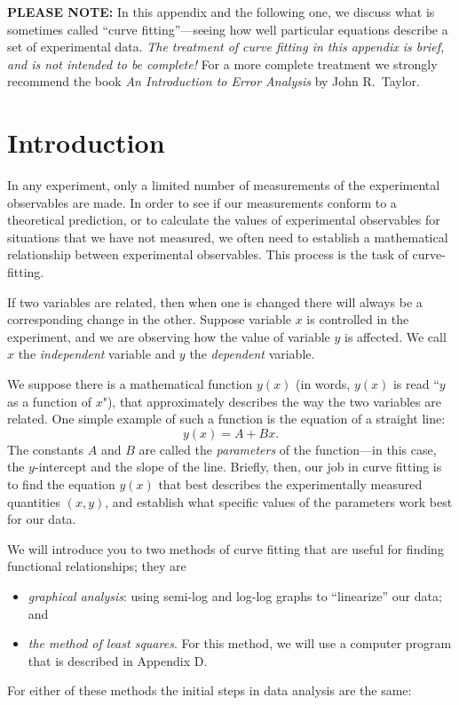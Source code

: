\newapp
\label{datahandle}
{\bf PLEASE NOTE:}  In this appendix and the following one,
 we discuss what is sometimes
called ``curve fitting''---seeing how well particular equations
describe a set of experimental data.  {\em The treatment of curve
fitting
in this appendix is brief, and is not intended to be complete!}
For a more complete treatment we strongly recommend the book {\em An
Introduction to Error Analysis} by John R.~Taylor.

\section*{Introduction}

     In any experiment, only a limited number of measurements of
the experimental observables are made.  In order to see if our
measurements conform to a theoretical prediction, or to calculate
the values of experimental observables for situations that we
have not measured, we often need to establish a mathematical
relationship between experimental observables.  This process is the
task of curve-fitting.

    If two variables are related, then when one is changed there will
always be a corresponding change in the other.  Suppose variable $x$
is controlled in the experiment, and we are observing how the value of
variable $y$ is affected.  We call $x$  the {\em independent} variable
and $y$  the {\em dependent} variable.

We suppose there is a mathematical function $y(x)$
(in words, $y(x)$ is read ``$y$ as a function of $x$"), that
approximately
describes the way the two variables are related.  One simple example of
such a function is the equation of a straight line:
\[
y(x) = A + Bx .
\]
The constants $A$ and $B$ are called the {\em parameters} of the
function---in this case, the $y$-intercept and the slope of the line.
Briefly, then, our job in curve fitting is to
find the equation $y(x)$ that best describes the
experimentally measured quantities $(x, y)$,   and
establish what specific values of the parameters work best for our
data.

     We will introduce you to two methods of curve fitting that
are useful for finding functional relationships; they are
\begin{itemize}
	\item {\em graphical analysis}: using semi-log and log-log
graphs to ``linearize'' our data; and
%	
	\item {\em the method of least squares}.  For this method,
	we will use a computer program that is described in
	Appendix D.
\end{itemize}	
For either
of these methods the initial steps in data analysis are the same:

